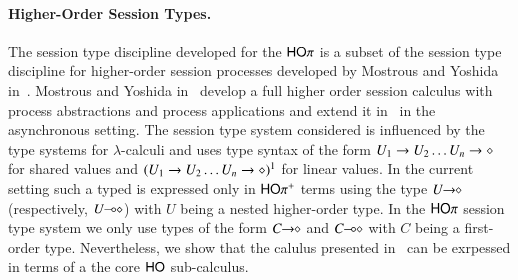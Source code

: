 \paragraph{Higher-Order Session Types.}
The session type discipline developed for the $\mathsf{HO}\pi$ is a subset
of the session type discipline
for higher-order session processes developed by Mostrous and Yoshida
in~\cite{tlca07,mostrous09sessionbased}.
Mostrous and Yoshida in~\cite{tlca07} develop a full higher order session calculus
with process abstractions and process applications and extend it
in~\cite{mostrous09sessionbased} in the asynchronous setting.
The session type
system considered is influenced by the type systems for $\lambda$-calculi and
uses type syntax of the form $U_1 \rightarrow U_2 \dots U_n \rightarrow \diamond$
for shared values and $(U_1 \rightarrow U_2 \dots U_n \rightarrow \diamond)^{1}$
for linear values.
In the current setting such a typed is expressed only in $\mathsf{HO}\pi^{\mathsf +}$
terms using the type $U\!\! \rightarrow\!\! \diamond$ (respectively, $U\!\! \multimap\!\! \diamond$)
with $U$ being a nested higher-order type.
In the $\mathsf{HO}\pi$ session type system we only use types of the form
$C\!\! \rightarrow\!\! \diamond$ and $C\!\! \multimap\!\! \diamond$ with $C$ being a first-order type.
Nevertheless, we show that
the calulus presented in~\cite{tlca07} can be exrpessed in terms of a the
core $\mathsf{HO}$ sub-calculus.

